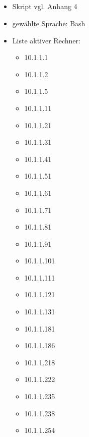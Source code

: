 \documentclass[twoside]{article}
\begin{document}
\subsection{}
\begin{itemize}
	\item Skript vgl. Anhang 4
	\item gewählte Sprache: Bash
	\item Liste aktiver Rechner:
	\begin{itemize}
		\item 10.1.1.1
		\item 10.1.1.2
		\item 10.1.1.5
		\item 10.1.1.11
		\item 10.1.1.21
		\item 10.1.1.31
		\item 10.1.1.41
		\item 10.1.1.51
		\item 10.1.1.61
		\item 10.1.1.71
		\item 10.1.1.81
		\item 10.1.1.91
		\item 10.1.1.101
		\item 10.1.1.111
		\item 10.1.1.121
		\item 10.1.1.131
		\item 10.1.1.181
		\item 10.1.1.186
		\item 10.1.1.218
		\item 10.1.1.222
		\item 10.1.1.235
		\item 10.1.1.238
		\item 10.1.1.254
	\end{itemize}
\end{itemize}
\end{document}
